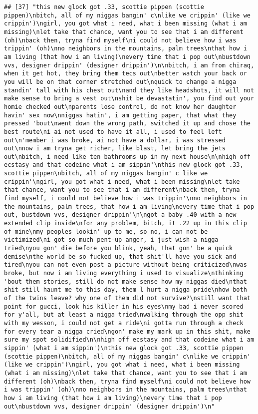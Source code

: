 \documentclass[]{article}
\begin{document}
\begin{verbatim}
## [37] "this new glock got .33, scottie pippen (scottie pippen)\nbitch, all of my niggas bangin' c\nlike we crippin' (like we crippin')\ngirl, you got what i need, what i been missing (what i am missing)\nlet take that chance, want you to see that i am different (oh)\nback then, tryna find myself\ni could not believe how i was trippin' (oh)\nno neighbors in the mountains, palm trees\nthat how i am living (that how i am living)\nevery time that i pop out\nbustdown vvs, designer drippin' (designer drippin')\n\nbitch, i am from chiraq, when it get hot, they bring them tecs out\nbetter watch your back or you will be on that corner stretched out\nquick to change a nigga standin' tall with his chest out\nand they like headshots, it will not make sense to bring a vest out\nshit be devastatin', you find out your homie checked out\nparents lose control, do not know her daughter havin' sex now\nniggas hatin', i am getting paper, that what they pressed 'bout\nwent down the wrong path, switched it up and chose the best route\ni ai not used to have it all, i used to feel left out\n'member i was broke, ai not have a dollar, i was stressed out\nnow i am tryna get richer, like blast, let bring the jets out\nbitch, i need like ten bathrooms up in my next house\n\nhigh off ecstasy and that codeine what i am sippin'\nthis new glock got .33, scottie pippen\nbitch, all of my niggas bangin' c like we crippin'\ngirl, you got what i need, what i been missing\nlet take that chance, want you to see that i am different\nback then, tryna find myself, i could not believe how i was trippin'\nno neighbors in the mountains, palm trees, that how i am living\nevery time that i pop out, bustdown vvs, designer drippin'\n\ngot a baby .40 with a new extended clip inside\nfor any problem, bitch, it .22 up in this clip of mine\nmy peoples lookin' up to me, so no, i can not be victimized\ni got so much pent-up anger, i just wish a nigga tried\nyou gon' die before you blink, yeah, that gon' be a quick demise\nthe world be so fucked up, that shit'll have you sick and tired\nyou can not even post a picture without being criticized\nwas broke, but now i am living everything i used to visualize\nthinking 'bout them stories, still do not make sense how my niggas died\nthat shit still haunt me to this day, them l hurt a nigga pride\nhow both of the twins leave? why one of them did not survive?\nstill want that point for gucci, look his killer in his eyes\nmy bad i never scored for y'all, but at least a nigga tried\nwalking through the opp shit with my wesson, i could not get a ride\ni gotta run through a check for every tear a nigga cried\ngon' make my mark up in this shit, make sure my spot solidified\n\nhigh off ecstasy and that codeine what i am sippin' (what i am sippin')\nthis new glock got .33, scottie pippen (scottie pippen)\nbitch, all of my niggas bangin' c\nlike we crippin' (like we crippin')\ngirl, you got what i need, what i been missing (what i am missing)\nlet take that chance, want you to see that i am different (oh)\nback then, tryna find myself\ni could not believe how i was trippin' (oh)\nno neighbors in the mountains, palm trees\nthat how i am living (that how i am living)\nevery time that i pop out\nbustdown vvs, designer drippin' (designer drippin')\n"                                 
\end{verbatim}
\end{document}
